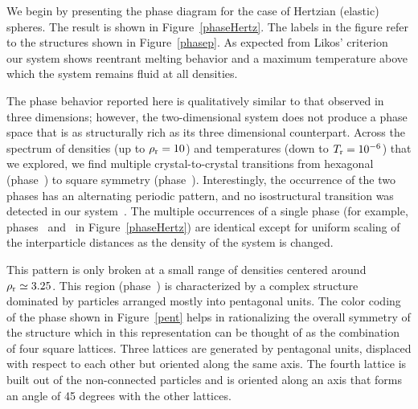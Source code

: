 {We begin by presenting the phase diagram for the case of Hertzian (elastic) spheres.
The result is shown in Figure~\ref{phaseHertz}.
The labels in the figure refer to the structures shown in Figure~\ref{phasep}. 
As expected from Likos' criterion~\cite{likos} our system shows reentrant melting behavior
and a maximum temperature above which the system remains fluid at all densities.
   
   
The phase behavior reported here is qualitatively similar to that observed in three dimensions;
however, the two-dimensional system does not produce a phase space that is as structurally rich  as its three dimensional counterpart. 
Across the spectrum of  densities (up to $\rho_{\rm r}=10$) and temperatures (down to 
$T_{\rm r}=10^{-6}$) that we explored, we find multiple crystal-to-crystal 
transitions from hexagonal (phase~) to square symmetry (phase~). 
Interestingly,  the occurrence of the two phases has an alternating periodic pattern, and no isostructural transition was detected in our system~\cite{mladek3}.
{The multiple occurrences of a single phase (for example, phases~ and~ in Figure~\ref{phaseHertz}) are identical except for uniform scaling of the interparticle distances as the density of the system is changed.}

This pattern is only broken at a small range of densities centered around $\rho_{\rm r}\simeq 3.25$.
This region (phase~) is characterized by a complex structure dominated by particles arranged mostly into
pentagonal units. The color coding of the phase shown in Figure~\ref{pent} helps in rationalizing the overall
symmetry of the structure which in this representation can be thought of as the combination of four 
square lattices. Three lattices are generated by pentagonal units, displaced with
respect to each other but  oriented along the same axis. The fourth lattice is built out
 of the non-connected particles and is oriented along an axis 
 that forms an angle of 45 degrees with the other lattices. 

\begin{figure}
	\begin{center}


\end{center}
\end{figure}}
